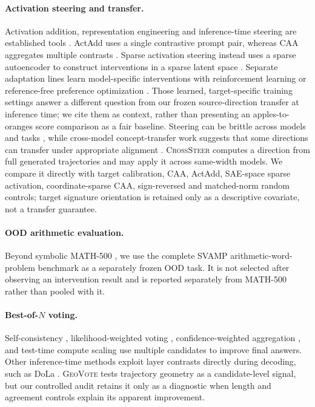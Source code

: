 \paragraph{Activation steering and transfer.}
Activation addition, representation engineering and inference-time steering are
established tools \citep{turner-steering-2023,panickssery-iti-2024,zou-rep-2023,
todd-function-vectors-2024}.  ActAdd uses a single contrastive prompt pair,
whereas CAA aggregates multiple contrasts \citep{turner-steering-2023,
panickssery-iti-2024}.  Sparse activation steering instead uses a sparse
autoencoder to construct interventions in a sparse latent space
\citep{bayat-etal-2025-sas}.  Separate adaptation lines learn model-specific
interventions with reinforcement learning or reference-free preference
optimization \citep{sinii-etal-2025-steering,wu-etal-2025-reps}.  Those learned,
target-specific training settings answer a different question from our frozen
source-direction transfer at inference time; we cite them as context, rather
than presenting an apples-to-oranges score comparison as a fair baseline.
Steering can be brittle across models and tasks
\citep{tan-etal-2025-steering-off-course}, while cross-model concept-transfer work
suggests that some directions can transfer under appropriate alignment
\citep{huang-etal-2025-cross}.  \textsc{CrossSteer} computes a direction from
full generated trajectories and may apply it across same-width models.  We
compare it directly with target calibration, CAA, ActAdd, SAE-space sparse activation, coordinate-sparse CAA, sign-reversed and
matched-norm random controls; target signature orientation is retained only as a
descriptive covariate, not a transfer guarantee.

\paragraph{OOD arithmetic evaluation.}
Beyond symbolic MATH-500
\citep{hendrycks2021measuring,lightman-verify-2023}, we use the complete SVAMP arithmetic-word-problem
benchmark \citep{patel-etal-2021-nlp} as a separately frozen OOD task.  It is
not selected after observing an intervention result and is reported separately
from MATH-500 rather than pooled with it.

\paragraph{Best-of-$N$ voting.}
Self-consistency \citep{wang-selfconsistency-2023}, likelihood-weighted voting
\citep{xu-etal-2024-soft}, confidence-weighted aggregation
\citep{xu-etal-2025-confidence}, and test-time compute scaling
\citep{snell-tts-2024} use multiple candidates to improve final answers.  Other
inference-time methods exploit layer contrasts directly during decoding, such as
DoLa \citep{chuang-dola-2024}.  \textsc{GeoVote} tests trajectory geometry as a
candidate-level signal, but our controlled audit retains it only as a diagnostic
when length and agreement controls explain its apparent improvement.

